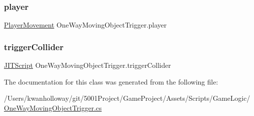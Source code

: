 \subsubsection{\texorpdfstring{player}{player}}
{\footnotesize\ttfamily \hyperlink{class_player_movement}{Player\+Movement} One\+Way\+Moving\+Object\+Trigger.\+player}

\mbox{\label{class_one_way_moving_object_trigger_a826ac8904700117919e40f3954901ba6}} 
\subsubsection{\texorpdfstring{trigger\+Collider}{triggerCollider}}
{\footnotesize\ttfamily \hyperlink{class_j_i_t_script}{J\+I\+T\+Script} One\+Way\+Moving\+Object\+Trigger.\+trigger\+Collider}



The documentation for this class was generated from the following file\+:\begin{DoxyCompactItemize}
\item 
/\+Users/kwanholloway/git/5001\+Project/\+Game\+Project/\+Assets/\+Scripts/\+Game\+Logic/\hyperlink{_one_way_moving_object_trigger_8cs}{One\+Way\+Moving\+Object\+Trigger.\+cs}\end{DoxyCompactItemize}
